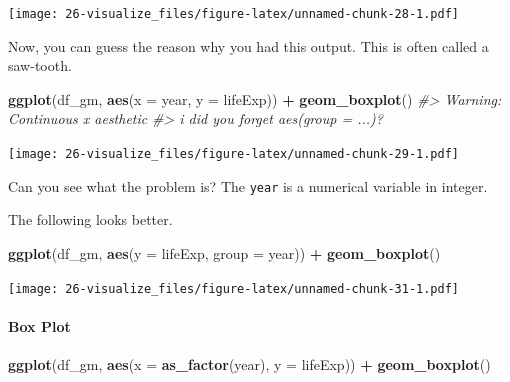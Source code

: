 \documentclass[
  xelatex, ja=standard]{bxjsbook}
\newenvironment{Shaded}{\begin{snugshade}}{\end{snugshade}}
\newcommand{\AttributeTok}[1]{\textcolor[rgb]{0.13,0.29,0.53}{#1}}
\newcommand{\CommentTok}[1]{\textcolor[rgb]{0.56,0.35,0.01}{\textit{#1}}}
\newcommand{\FunctionTok}[1]{\textcolor[rgb]{0.13,0.29,0.53}{\textbf{#1}}}
\newcommand{\NormalTok}[1]{#1}
\newcommand{\SpecialCharTok}[1]{\textcolor[rgb]{0.81,0.36,0.00}{\textbf{#1}}}
\theoremstyle{definition}
\theoremstyle{definition}
\theoremstyle{definition}
\theoremstyle{definition}
\theoremstyle{remark}
\begin{document}
\texttt{[image: 26-visualize\_files/figure-latex/unnamed-chunk-28-1.pdf]}

Now, you can guess the reason why you had this output. This is often called a saw-tooth.

\begin{Shaded}
\begin{Highlighting}[]
\FunctionTok{ggplot}\NormalTok{(df\_gm, }\FunctionTok{aes}\NormalTok{(}\AttributeTok{x =}\NormalTok{ year, }\AttributeTok{y =}\NormalTok{ lifeExp)) }\SpecialCharTok{+} \FunctionTok{geom\_boxplot}\NormalTok{()}
\CommentTok{\#\textgreater{} Warning: Continuous x aesthetic}
\CommentTok{\#\textgreater{} i did you forget \textasciigrave{}aes(group = ...)\textasciigrave{}?}
\end{Highlighting}
\end{Shaded}

\texttt{[image: 26-visualize\_files/figure-latex/unnamed-chunk-29-1.pdf]}

Can you see what the problem is? The \texttt{year} is a numerical variable in integer.

\begin{Shaded}
\end{Shaded}

The following looks better.

\begin{Shaded}
\begin{Highlighting}[]
\FunctionTok{ggplot}\NormalTok{(df\_gm, }\FunctionTok{aes}\NormalTok{(}\AttributeTok{y =}\NormalTok{ lifeExp, }\AttributeTok{group =}\NormalTok{ year)) }\SpecialCharTok{+} \FunctionTok{geom\_boxplot}\NormalTok{()}
\end{Highlighting}
\end{Shaded}

\texttt{[image: 26-visualize\_files/figure-latex/unnamed-chunk-31-1.pdf]}

\hypertarget{box-plot}{%
\paragraph{Box Plot}\label{box-plot}}

\begin{Shaded}
\begin{Highlighting}[]
\FunctionTok{ggplot}\NormalTok{(df\_gm, }\FunctionTok{aes}\NormalTok{(}\AttributeTok{x =} \FunctionTok{as\_factor}\NormalTok{(year), }\AttributeTok{y =}\NormalTok{ lifeExp)) }\SpecialCharTok{+} \FunctionTok{geom\_boxplot}\NormalTok{()}
\end{Highlighting}
\end{Shaded}
\end{document}
